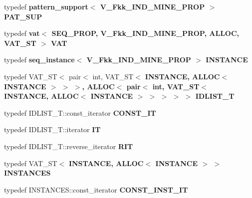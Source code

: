 \begin{CompactItemize}
\item 
typedef \bf{pattern\_\-support}$<$ V\_\-Fkk\_\-IND\_\-MINE\_\-PROP $>$ \textbf{PAT\_\-SUP}\label{classvat_3_01SEQ__PROP_00_01V__Fkk__IND__MINE__PROP_00_01ALLOC_00_01VAT__ST_01_4_d70cbd6187c079ec28d56b3cd0376f90}

\item 
typedef \bf{vat}$<$ SEQ\_\-PROP, V\_\-Fkk\_\-IND\_\-MINE\_\-PROP, ALLOC, VAT\_\-ST $>$ \textbf{VAT}\label{classvat_3_01SEQ__PROP_00_01V__Fkk__IND__MINE__PROP_00_01ALLOC_00_01VAT__ST_01_4_63f2c2de8809a34358ac0061e8b69d6e}

\item 
typedef \bf{seq\_\-instance}$<$ V\_\-Fkk\_\-IND\_\-MINE\_\-PROP $>$ \textbf{INSTANCE}\label{classvat_3_01SEQ__PROP_00_01V__Fkk__IND__MINE__PROP_00_01ALLOC_00_01VAT__ST_01_4_8fb1c970133d6b40a774b20264f826e4}

\item 
typedef VAT\_\-ST$<$ pair$<$ int, VAT\_\-ST$<$ \bf{INSTANCE}, ALLOC$<$ \bf{INSTANCE} $>$ $>$ $>$, ALLOC$<$ pair$<$ int, VAT\_\-ST$<$ \bf{INSTANCE}, ALLOC$<$ \bf{INSTANCE} $>$ $>$ $>$ $>$ $>$ \textbf{IDLIST\_\-T}\label{classvat_3_01SEQ__PROP_00_01V__Fkk__IND__MINE__PROP_00_01ALLOC_00_01VAT__ST_01_4_b35ed1a230ffa6e2270d3e596f47b71a}

\item 
typedef IDLIST\_\-T::const\_\-iterator \textbf{CONST\_\-IT}\label{classvat_3_01SEQ__PROP_00_01V__Fkk__IND__MINE__PROP_00_01ALLOC_00_01VAT__ST_01_4_a28365637d6b4dfa53d8d10e0433f863}

\item 
typedef IDLIST\_\-T::iterator \textbf{IT}\label{classvat_3_01SEQ__PROP_00_01V__Fkk__IND__MINE__PROP_00_01ALLOC_00_01VAT__ST_01_4_8b38968dc6d0877c169889a19074aa68}

\item 
typedef IDLIST\_\-T::reverse\_\-iterator \textbf{RIT}\label{classvat_3_01SEQ__PROP_00_01V__Fkk__IND__MINE__PROP_00_01ALLOC_00_01VAT__ST_01_4_5213309f7748fd81b7610a5bd703d9d7}

\item 
typedef VAT\_\-ST$<$ \bf{INSTANCE}, ALLOC$<$ \bf{INSTANCE} $>$ $>$ \textbf{INSTANCES}\label{classvat_3_01SEQ__PROP_00_01V__Fkk__IND__MINE__PROP_00_01ALLOC_00_01VAT__ST_01_4_4bb61917d8fb258b2fdd8b5d3c991322}

\item 
typedef INSTANCES::const\_\-iterator \bf{CONST\_\-INST\_\-IT}
\end{CompactItemize}
